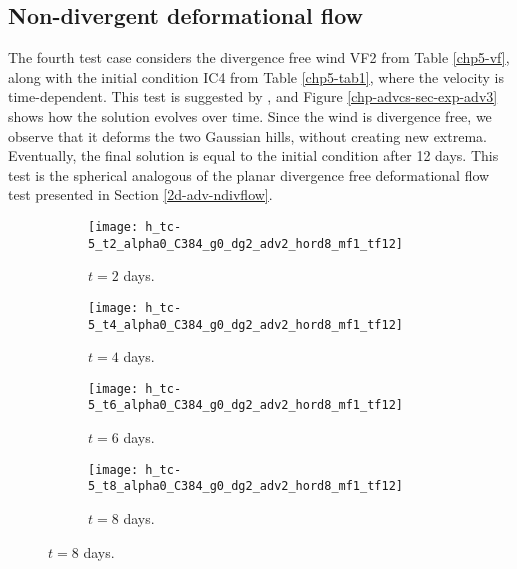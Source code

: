 \newpage
\subsection{Non-divergent deformational flow}
The fourth test case considers the divergence free wind VF2 from Table \ref{chp5-vf}, along with the initial condition IC4 from Table \ref{chp5-tab1}, 
where the velocity is time-dependent.
This test is suggested by \citet{nair:2010}, and Figure \ref{chp-advcs-sec-exp-adv3} shows how the solution evolves over time.
Since the wind is divergence free, we observe that it deforms the two Gaussian hills, without creating new extrema.
Eventually, the final solution is equal to the initial condition after 12 days.
This test is the spherical analogous of the planar divergence free deformational flow test presented in Section \ref{2d-adv-ndivflow}.
\begin{figure}[!htb]
	\centering
	\begin{subfigure}{0.45\textwidth}
		\centering
		\texttt{[image: h\_tc-5\_t2\_alpha0\_C384\_g0\_dg2\_adv2\_hord8\_mf1\_tf12]}
		\caption{$t=2$ days.\label{chp-advcs-sec-exp-adv3-a}}
	\end{subfigure}
	\begin{subfigure}{0.45\textwidth}
		\centering
		\texttt{[image: h\_tc-5\_t4\_alpha0\_C384\_g0\_dg2\_adv2\_hord8\_mf1\_tf12]}
		\caption{$t=4$ days.\label{chp-advcs-sec-exp-adv3-b}}
	\end{subfigure}

	\begin{subfigure}{0.45\textwidth}
		\centering
		\texttt{[image: h\_tc-5\_t6\_alpha0\_C384\_g0\_dg2\_adv2\_hord8\_mf1\_tf12]}
		\caption{$t=6$ days.\label{chp-advcs-sec-exp-adv3-c}}
	\end{subfigure}
	\begin{subfigure}{0.45\textwidth}
		\centering
		\texttt{[image: h\_tc-5\_t8\_alpha0\_C384\_g0\_dg2\_adv2\_hord8\_mf1\_tf12]}
		\caption{$t=8$ days.\label{chp-advcs-sec-exp-adv3-d}}
	\end{subfigure}


\end{figure}
